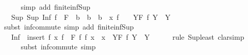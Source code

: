 \begin{isabellebody}
\ \ \ \ \isamarkupfalse%
\ {\isacharparenleft}{\kern0pt}simp\ add{\isacharcolon}{\kern0pt}\ finite{\isacharunderscore}{\kern0pt}inf{\isacharunderscore}{\kern0pt}Sup{\isacharparenright}{\kern0pt}\isanewline
\isanewline
\ \ \isamarkupfalse%
\ \isamarkupfalse%
\ {\isachardoublequoteopen}{\isachardot}{\kern0pt}{\isachardot}{\kern0pt}{\isachardot}{\kern0pt}\ {\isacharequal}{\kern0pt}\ Sup\ {\isacharbraceleft}{\kern0pt}Sup\ {\isacharbraceleft}{\kern0pt}Inf\ {\isacharparenleft}{\kern0pt}f\ {\isacharbackquote}{\kern0pt}\ F{\isacharparenright}{\kern0pt}\ {\isasymsqinter}\ b\ {\isacharbar}{\kern0pt}\ b\ {\isachardot}{\kern0pt}\ b\ {\isasymin}\ x{\isacharbraceright}{\kern0pt}\ {\isacharbar}{\kern0pt}f\ \ {\isachardot}{\kern0pt}\ \ {\isacharparenleft}{\kern0pt}{\isasymforall}Y{\isasymin}F{\isachardot}{\kern0pt}\ f\ Y\ {\isasymin}\ Y{\isacharparenright}{\kern0pt}{\isacharbraceright}{\kern0pt}{\isachardoublequoteclose}\isanewline
\ \ \ \ \isamarkupfalse%
\ {\isacharparenleft}{\kern0pt}subst\ inf{\isacharunderscore}{\kern0pt}commute{\isacharparenright}{\kern0pt}\ {\isacharparenleft}{\kern0pt}simp\ add{\isacharcolon}{\kern0pt}\ finite{\isacharunderscore}{\kern0pt}inf{\isacharunderscore}{\kern0pt}Sup{\isacharparenright}{\kern0pt}\isanewline
\isanewline
\ \ \isamarkupfalse%
\ \isamarkupfalse%
\ {\isachardoublequoteopen}{\isachardot}{\kern0pt}{\isachardot}{\kern0pt}{\isachardot}{\kern0pt}\ {\isasymle}\ {\isasymSqunion}{\isacharparenleft}{\kern0pt}Inf\ {\isacharbackquote}{\kern0pt}\ {\isacharbraceleft}{\kern0pt}insert\ {\isacharparenleft}{\kern0pt}f\ x{\isacharparenright}{\kern0pt}\ {\isacharparenleft}{\kern0pt}f\ {\isacharbackquote}{\kern0pt}\ F{\isacharparenright}{\kern0pt}\ {\isacharbar}{\kern0pt}f{\isachardot}{\kern0pt}\ f\ x\ {\isasymin}\ x\ {\isasymand}\ {\isacharparenleft}{\kern0pt}{\isasymforall}Y{\isasymin}F{\isachardot}{\kern0pt}\ f\ Y\ {\isasymin}\ Y{\isacharparenright}{\kern0pt}{\isacharbraceright}{\kern0pt}{\isacharparenright}{\kern0pt}{\isachardoublequoteclose}\isanewline
\ \ \ \ \isamarkupfalse%
\ {\isacharparenleft}{\kern0pt}rule\ Sup{\isacharunderscore}{\kern0pt}least{\isacharcomma}{\kern0pt}\ clarsimp{\isacharparenright}{\kern0pt}{\isacharplus}{\kern0pt}\isanewline
\ \ \ \ \isamarkupfalse%
\ {\isacharparenleft}{\kern0pt}subst\ inf{\isacharunderscore}{\kern0pt}commute{\isacharcomma}{\kern0pt}\ simp{\isacharparenright}{\kern0pt}\isanewline
\ \ \ \ \isamarkupfalse%
\isanewline
\isanewline
\ \ \isamarkupfalse%

\end{isabellebody}
